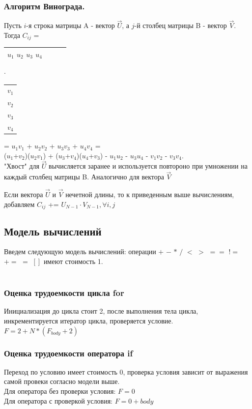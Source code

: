 \documentclass[12pt]{article}
\begin{document}
\subsubsection{Алгоритм Винограда.}
Пусть $i$-я строка матрицы A - вектор  $\vec{U}$, а $j$-й столбец матрицы B - вектор $\vec{V}$. \\
Тогда $C_{ij}$ = \begin{tabular}{|c|c|c|c|}
	\hline
	$u_{1}$  $u_{2}$  $u_{3}$  $u_{4}$ \\
	\hline
\end{tabular} $\cdot$ 
\begin{tabular}{|c|}
	\hline
	$v_{1}$ \\
	$v_{2}$  \\
	$v_{3}$   \\
	$v_{4}$  \\
	\hline
\end{tabular}
= $u_{1}$$v_{1}$ + $u_{2}$$v_{2}$ + $u_{3}$$v_{3}$ + $u_{4}$$v_{4}$ = \\
($u_{1}$+$v_{2}$)($u_{2}$$v_{1}$) + ($u_{3}$+$v_{4}$)($u_{4}$+$v_{3}$) - $u_{1}$$u_{2}$ - $u_{3}$$u_{4}$ - $v_{1}$$v_{2}$ - $v_{3}$$v_{4}$. \\

"Хвост" для  $\vec{U}$ вычисляется заранее и используется повтороно при умножении на каждый столбец матрицы B. Аналогично для вектора $\vec{V}$

Если вектора $\vec{U}$ и $\vec{V}$ нечетной длины, то к приведенным выше вычислениям, добавляем 
$C_{ij}$ += $U_{N-1}\cdot V_{N-1}, \forall i,j$
\\

\subsection{Модель вычислений}
Введем следующую модель вычислений:
операции $+$  $-$  $*$  $/$  $<$  $>$  $==$  $!=$  $+=$  $=$  $[]$  имеют стоимость 1.
\\
\\
\subsubsection{Оценка трудоемкости цикла for}
Инициализация до цикла стоит 2, после выполнения тела цикла, инкрементируется итератор цикла, проверяется условие.
\\
$F = 2 + N*(F_{body} + 2)$

\subsubsection{Оценка трудоемкости оператора if}
Переход по условию имеет стоимость 0, проверка условия зависит от выражения самой провеки согласно модели выше.
\\Для оператора без проверки условия: $F =0$
\\Для оператора с проверкой условия: $F = 0 + body$
\newpage
\end{document}
